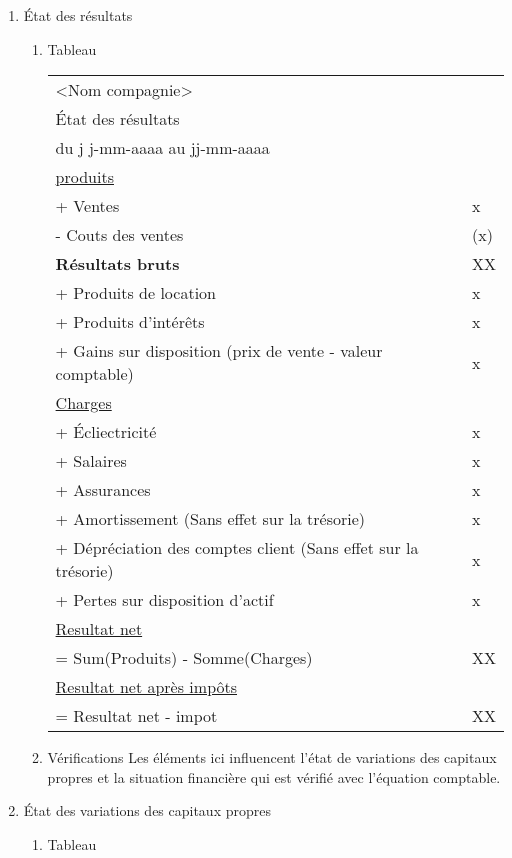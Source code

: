 \documentclass[11pt]{article}
\begin{document}
\begin{enumerate}
\item État des résultats
\label{sec:org5c7fff5}
\begin{enumerate}
\item Tableau
\label{sec:orga48a191}
\begin{center}
\begin{tabular}{ll}
<Nom compagnie> & \\
État des résultats & \\
du j j-mm-aaaa au jj-mm-aaaa & \\
\hline
\uline{produits} & \\
+ Ventes & x\\
- Couts des ventes & (x)\\
\textbf{Résultats bruts} & XX\\
+ Produits de location & x\\
+ Produits d'intérêts & x\\
+ Gains sur disposition (prix de vente - valeur comptable) & x\\
\uline{Charges} & \\
+ Écliectricité & x\\
+ Salaires & x\\
+ Assurances & x\\
+ Amortissement (Sans effet sur la trésorie) & x\\
+ Dépréciation des comptes client (Sans effet sur la trésorie) & x\\
+ Pertes sur disposition d'actif & x\\
\uline{Resultat net} & \\
= Sum(Produits) - Somme(Charges) & XX\\
\uline{Resultat net après impôts} & \\
= Resultat net - impot & XX\\
\end{tabular}
\end{center}
\item Vérifications
\label{sec:orge59aba6}
Les éléments ici influencent l'état de variations des capitaux propres et la
situation financière qui est vérifié avec l'équation comptable.
\end{enumerate}
\item État des variations des capitaux propres
\label{sec:org573ffca}
\begin{enumerate}
\item Tableau
\label{sec:orge1943d1}
\begin{center}

\end{center}
\end{enumerate}
\end{enumerate}
\end{document}
